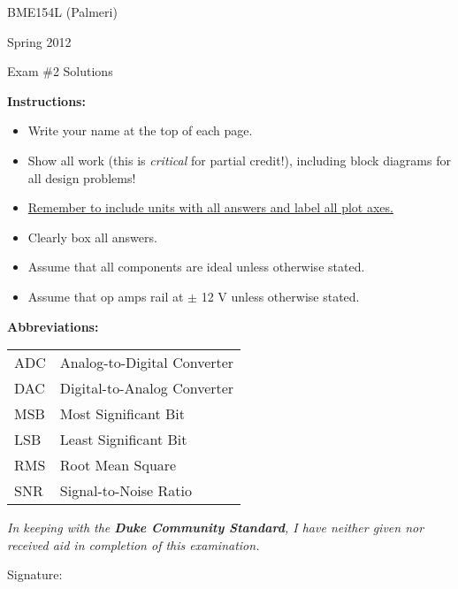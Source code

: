 

\vspace*{0.5in}

\centerline{\LARGE BME154L (Palmeri)}
\vspace*{0.25in}
\centerline{\LARGE Spring 2012}
\vspace*{0.25in}
\centerline{\LARGE Exam \#2 Solutions}
\vspace*{0.25in}

{\bf Instructions:} 
\begin{itemize}
\item Write your name at the top of each page.
\item Show all work (this is {\it critical} for partial credit!), including block diagrams for all design problems!
\item \underline{Remember to include units with all answers and label all plot axes.}
\item Clearly box all answers.
\item Assume that all components are ideal unless otherwise stated.
\item Assume that op amps rail at $\pm$ 12 V unless otherwise stated.
\end{itemize}

{\bf Abbreviations:}

\begin{tabular}{ll}
ADC & Analog-to-Digital Converter \\
DAC & Digital-to-Analog Converter \\
MSB & Most Significant Bit \\
LSB & Least Significant Bit \\
RMS & Root Mean Square \\
SNR & Signal-to-Noise Ratio \\
\end{tabular}

\vspace*{1.0in}

\emph{\large In keeping with the {\bf Duke Community Standard}, I have neither given
nor received aid in completion of this examination.}

\vspace*{0.5in}

Signature:\underline{\hspace*{3.0in}}
